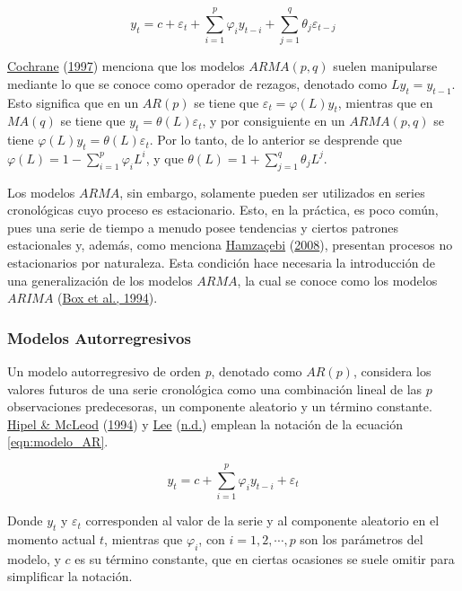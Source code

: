 \documentclass[
]{article}
\begin{document}
\begin{equation}
\label{eqn:modelo_ARMA}
y_t=c+\varepsilon_t+\sum_{i=1}^p \varphi_iy_{t-i}+\sum_{j=1}^q \theta_j \varepsilon_{t-j}
\end{equation}

\protect\hyperlink{ref-Cochrane}{Cochrane}
(\protect\hyperlink{ref-Cochrane}{1997}) menciona que los modelos
\(ARMA(p,q)\) suelen manipularse mediante lo que se conoce como operador
de rezagos, denotado como \(Ly_t=y_{t-1}\). Esto significa que en un
\(AR(p)\) se tiene que \(\varepsilon_t=\varphi(L)y_t\), mientras que en
\(MA(q)\) se tiene que \(y_t=\theta(L)\varepsilon_t\), y por
consiguiente en un \(ARMA(p,q)\) se tiene
\(\varphi(L)y_t=\theta(L)\varepsilon_t\). Por lo tanto, de lo anterior
se desprende que \(\varphi(L)=1-\sum_{i=1}^p \varphi_iL^i\), y que
\(\theta(L)=1+\sum_{j=1}^q\theta_jL^j\).

Los modelos \(ARMA\), sin embargo, solamente pueden ser utilizados en
series cronológicas cuyo proceso es estacionario. Esto, en la práctica,
es poco común, pues una serie de tiempo a menudo posee tendencias y
ciertos patrones estacionales y, además, como menciona
\protect\hyperlink{ref-Hamzacebi}{Hamzaçebi}
(\protect\hyperlink{ref-Hamzacebi}{2008}), presentan procesos no
estacionarios por naturaleza. Esta condición hace necesaria la
introducción de una generalización de los modelos \(ARMA\), la cual se
conoce como los modelos \(ARIMA\)
(\protect\hyperlink{ref-box-jenkins}{Box et al., 1994}).

\subsubsection{Modelos Autorregresivos}

Un modelo autorregresivo de orden \emph{p}, denotado como \(AR(p)\),
considera los valores futuros de una serie cronológica como una
combinación lineal de las \(p\) observaciones predecesoras, un
componente aleatorio y un término constante.
\protect\hyperlink{ref-Hipel}{Hipel \& McLeod}
(\protect\hyperlink{ref-Hipel}{1994}) y \protect\hyperlink{ref-Lee}{Lee}
(\protect\hyperlink{ref-Lee}{n.d.}) emplean la notación de la ecuación
\eqref{eqn:modelo_AR}.

\begin{equation}
\label{eqn:modelo_AR}
y_t=c+\sum_{i=1}^p \varphi_iy_{t-i}+\varepsilon_t
\end{equation}

Donde \(y_t\) y \(\varepsilon_t\) corresponden al valor de la serie y al
componente aleatorio en el momento actual \(t\), mientras que
\(\varphi_i\), con \(i=1,2,\cdots,p\) son los parámetros del modelo, y
\(c\) es su término constante, que en ciertas ocasiones se suele omitir
para simplificar la notación.
\end{document}
